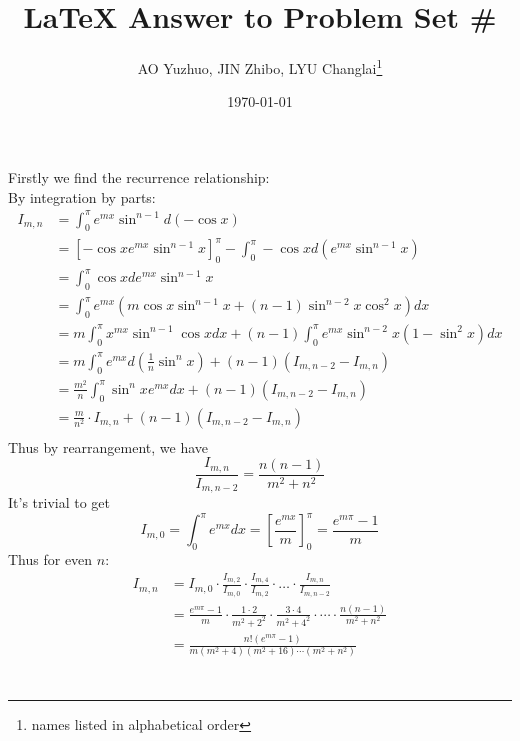 \documentclass{article}
\title{\LaTeX{} Answer to Problem Set \#}
\author{AO Yuzhuo, JIN Zhibo, LYU Changlai\thanks{names listed in alphabetical order}}
\date{\today}
\begin{document}
\maketitle

\section{} %
Firstly we find the recurrence relationship:\\
By integration by parts:
\begin{align*}
    I_{m,n}&=\int_{0}^{\pi}e^{mx}\sin^{n-1}d(-\cos x)\\
    &=\left[-\cos x e^{mx}\sin ^{n-1}x\right]_0^{\pi}-
    \int_{0}^{\pi}-\cos x d(e^{mx}\sin ^{n-1}x)\\
    &=\int_{0}^{\pi}\cos x d e^{mx}\sin ^{n-1}x\\
    &=\int_{0}^{\pi}e^{mx}\left(m\cos x\sin ^{n-1}x+(n-1)\sin^{n-2}x\cos^2 x\right)dx\\
    &=m\int_{0}^{\pi}x^{mx}\sin ^{n-1}\cos x dx +(n-1)\int_{0}^{\pi}
    e^{mx}\sin^{n-2}x(1-\sin^2 x)dx\\
    &=m\int_{0}^{\pi}e^{mx}d\left(\frac{1}{n}\sin ^{n}x\right)+(n-1)(I_{m,n-2}-I_{m,n})\\
    &=\frac{m^2}{n}\int_{0}^{\pi}\sin ^n xe^{mx}dx+(n-1)(I_{m,n-2}-I_{m,n})\\
    &=\frac{m}{n^2}\cdot I_{m,n}+(n-1)(I_{m,n-2}-I_{m,n})\\
\end{align*}
Thus by rearrangement, we have
$$\frac{I_{m,n}}{I_{m,n-2}}=\frac{n(n-1)}{m^2+n^2}$$
It's trivial to get 
$$I_{m,0}=\int_{0}^{\pi}e^{mx}dx=\left[\frac{e^{mx}}{m}\right]^\pi_0=\frac{e^{m\pi}-1}{m}$$
Thus for even $n$:
\begin{align*}
    I_{m,n}&=I_{m,0}\cdot\frac{I_{m,2}}{I_{m,0}}\cdot\frac{I_{m,4}}{I_{m,2}}
    \cdot\dots\cdot\frac{I_{m,n}}{I_{m,n-2}}\\
    &=\frac{e^{m\pi}-1}{m}\cdot\frac{1\cdot 2}{m^2+2^2}\cdot
    \frac{3\cdot 4}{m^2+4^2}\cdot\cdots\cdot
    \frac{n(n-1)}{m^2+n^2}\\
    &=\frac{n!(e^{m\pi}-1)}{m(m^2+4)(m^2+16)\cdots(m^2+n^2)}
\end{align*}

\section{} %
\end{document}
